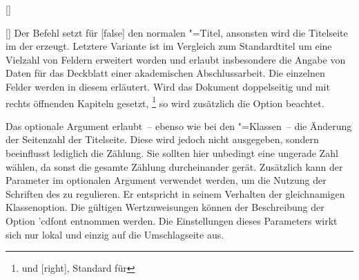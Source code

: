 \begin{Declaration}{}
\begin{Declaration}[v2.02]{%
  []%
}
\begin{Declaration}[v2.02]{[\PSet]}
\printdeclarationlist%
%
%
%
Der Befehl  setzt für [false] den normalen 
\KOMAScript"=Titel{}, ansonsten wird die Titelseite im \CD der \TnUD erzeugt. 
Letztere Variante ist im Vergleich zum Standardtitel um eine Vielzahl von 
Feldern erweitert worden und erlaubt insbesondere die Angabe von Daten für das 
Deckblatt einer akademischen Abschlussarbeit. Die einzelnen Felder werden in 
diesem \autorefname erläutert. Wird das Dokument doppelseitig und mit rechts 
öffnenden Kapiteln gesetzt,%
\footnote{%
   und [right], Standard für 
}
so wird zusätzlich die Option  beachtet.

Das optionale Argument erlaubt~-- ebenso wie bei den \KOMAScript"=Klassen~-- 
die Änderung der Seitenzahl der Titelseite. Diese wird jedoch nicht ausgegeben, 
sondern beeinflusst lediglich die Zählung. Sie sollten hier unbedingt eine 
ungerade Zahl wählen, da sonst die gesamte Zählung durcheinander gerät. 
Zusätzlich kann der Parameter  im optionalen 
Argument verwendet werden, um die Nutzung der Schriften des \CDs zu regulieren. 
Er entspricht in seinem Verhalten der gleichnamigen Klassenoption. Die gültigen 
Wertzuweisungen können der Beschreibung der Option \Option'{cdfont} entnommen 
werden. Die Einstellungen dieses Parameters wirkt sich nur lokal und einzig auf 
die Umschlagseite aus.
\end{Declaration}
\end{Declaration}
\end{Declaration}

